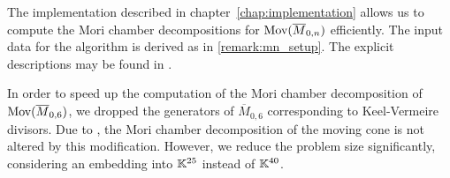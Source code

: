  The implementation described in chapter~\ref{chap:implementation} allows us to compute the Mori chamber decompositions for $\text{Mov}(\overline{M}_{0,n})$ efficiently. The input data for the algorithm is derived as in \ref{remark:mn_setup}. The explicit descriptions may be found in \cite{gitfan_symmetry}.

In order to speed up the computation of the Mori chamber decomposition of $\text{Mov}(\overline{M}_{0,6})$, we dropped the generators of $\overline{M}_{0,6}$ corresponding to Keel-Vermeire divisors. Due to \cite[Remark 6.7]{gitfan_symmetry}, the Mori chamber decomposition of the moving cone is not altered by this modification. However, we reduce the problem size significantly, considering an embedding into $\mathbb{K}^{25}$ instead of $\mathbb{K}^{40}$.
